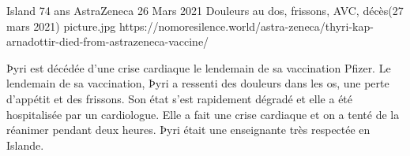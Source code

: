 {Island}
{74 ans}
{AstraZeneca}
{26 Mars 2021}
{Douleurs au dos, frissons, AVC, décès(27 mars 2021)}
{picture.jpg}
{https://nomoresilence.world/astra-zeneca/thyri-kap-arnadottir-died-from-astrazeneca-vaccine/}
{

Þyri est décédée d'une crise cardiaque le lendemain de sa vaccination Pfizer. Le
lendemain de sa vaccination, Þyri a ressenti des douleurs dans les os, une perte
d'appétit et des frissons. Son état s'est rapidement dégradé et elle a été
hospitalisée par un cardiologue. Elle a fait une crise cardiaque et on a tenté
de la réanimer pendant deux heures. Þyri était une enseignante très respectée en
Islande.

}
